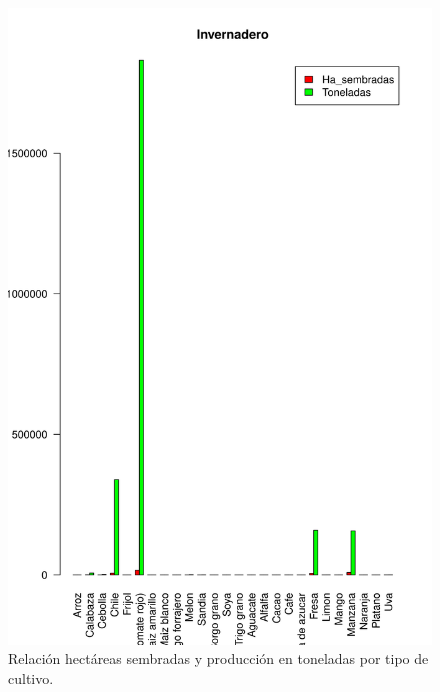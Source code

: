 \documentclass{article}
\begin{document}
\begin{figure}[ht]
\centering
\includegraphics[scale=.5]{Tablas_invernadero.png}
\caption{Relación hectáreas sembradas y producción en toneladas por tipo de cultivo.}
\label{fig:invernadero}
\end{figure}
\end{document}
